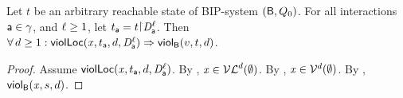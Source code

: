 \begin{proposition}
\label{prop:locScViol-implies-scViol}
\label{prop:lviol-implies-viol}
Let $t$ be an arbitrary reachable state of BIP-system $(\B, Q_0)$.
For all interactions $\act \in \gamma$, and $\l \ge 1$, let $t_\act = t \pj \dsk{\act}{\l}$.
Then\\
\ind $\fa d \ge 1: \locScViol{\ndx}{d}{t_\act}{\act}{\l} \imp \scViol{v}{d}{t}$.
\end{proposition}
%
\begin{proof}
Assume $\locScViol{\ndx}{d}{t_\act}{\act}{\l}$.
By ,  $\ndx  \in \lVFs^{d} (\ewfg)$.
By ,  $\ndx  \in \VFs^{d} (\ewfg)$.
By , $\scVd{\ndx}{d}{s}$.
\end{proof}
